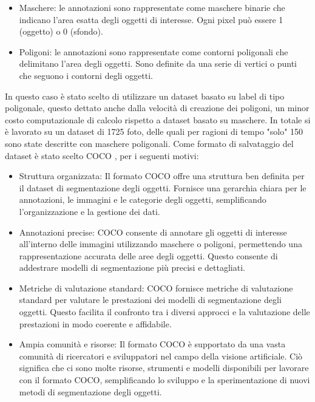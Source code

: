 \documentclass[a4paper,12pt]{report}
\begin{document}
      \begin{itemize}
        \item Maschere: le annotazioni sono rappresentate come maschere binarie che indicano l'area esatta degli oggetti di interesse. Ogni pixel può essere 1 (oggetto) o 0 (sfondo).
        \item Poligoni: le annotazioni sono rappresentate come contorni poligonali che delimitano l'area degli oggetti. Sono definite da una serie di vertici o punti che seguono i contorni degli oggetti.
      \end{itemize}
      \newpage
      In questo caso è stato scelto di utilizzare un dataset basato su label di tipo poligonale,
      questo dettato anche dalla velocità di creazione dei poligoni, un minor costo computazionale 
      di calcolo rispetto a dataset basato su maschere.
      In totale si è lavorato su un dataset di 1725 foto, delle quali per ragioni
      di tempo "solo" 150 sono state descritte con maschere poligonali. 
      Come formato di salvataggio del dataset è stato scelto COCO \cite{coco}, 
      per i seguenti motivi:
      \begin{itemize}
        \item Struttura organizzata: Il formato COCO offre una struttura ben definita per il dataset di segmentazione degli oggetti. Fornisce una gerarchia chiara per le annotazioni, le immagini e le categorie degli oggetti, semplificando l'organizzazione e la gestione dei dati.
        \item Annotazioni precise: COCO consente di annotare gli oggetti di interesse all'interno delle immagini utilizzando maschere o poligoni, permettendo una rappresentazione accurata delle aree degli oggetti. Questo consente di addestrare modelli di segmentazione più precisi e dettagliati.
        \item Metriche di valutazione standard: COCO fornisce metriche di valutazione standard per valutare le prestazioni dei modelli di segmentazione degli oggetti. Questo facilita il confronto tra i diversi approcci e la valutazione delle prestazioni in modo coerente e affidabile.
        \item Ampia comunità e risorse: Il formato COCO è supportato da una vasta comunità di ricercatori e sviluppatori nel campo della visione artificiale. Ciò significa che ci sono molte risorse, strumenti e modelli disponibili per lavorare con il formato COCO, semplificando lo sviluppo e la sperimentazione di nuovi metodi di segmentazione degli oggetti.
      \end{itemize}
\end{document}
